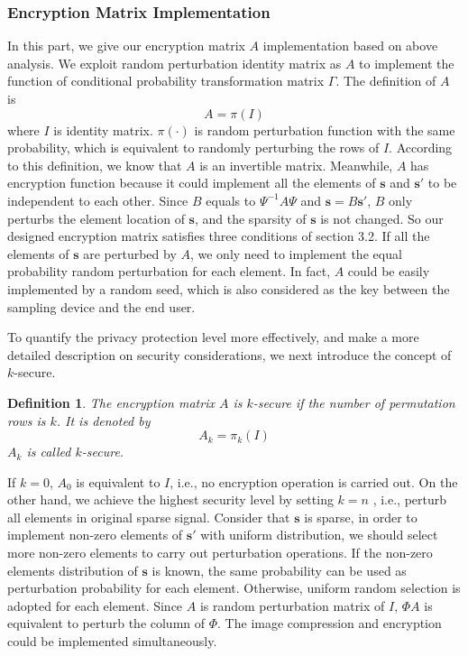 \documentclass[conference]{IEEEtran}
\newtheorem{definition}{Definition}
\begin{document}
\subsubsection{ Encryption Matrix Implementation}
In this part, we give our encryption matrix $A$ implementation based on above analysis.
We exploit random perturbation  identity matrix as $A$ to implement the function of conditional probability transformation matrix $\Gamma$. The definition of $A$ is
\begin{equation}\label{e_def_A}
    A=\pi(I)
\end{equation}
where $I$ is identity matrix. $\pi(\cdot)$ is random perturbation function with the same probability, which is equivalent to randomly perturbing the rows of $I$. According to this definition, we know that $A$ is an invertible matrix. Meanwhile, $A$ has encryption function because it could implement  all the elements of $\mathbf{s}$ and $\mathbf{s}'$  to be independent to each other. Since $B$ equals to $\Psi^{-1}A\Psi$ and $\mathbf{s}=B\mathbf{s}'$, $B$ only perturbs the element location of $\mathbf{s}$, and the sparsity of $\mathbf{s}$ is not changed. So our designed encryption matrix satisfies three conditions of section 3.2.
If all the elements of $\mathbf{s}$ are perturbed by $A$, we only need to implement the equal probability random perturbation for each element. In fact, $A$ could be easily implemented by a random seed, which is also considered as the key between the sampling device and the end user.

To quantify the privacy protection level more effectively, and make a more detailed description on security considerations,  we  next introduce the concept of $k$-secure.
\begin{definition}
The encryption matrix $A$ is $k$-secure if the number of permutation rows is $k$. It is denoted by
\begin{equation}\label{e_sd}
    A_k=\pi_k(I)
\end{equation}
$A_k$ is called $k$-secure.
\end{definition}

If $k=0$, $A_0$ is equivalent to $I$, i.e., no encryption operation is carried out. On the other hand, we achieve the highest security level by setting $k=n$ , i.e., perturb all elements in original sparse signal. Consider that $\mathbf{s}$ is sparse, in order to implement non-zero elements of $\mathbf{s}'$ with uniform distribution, we should select more non-zero elements to carry out perturbation operations. If the non-zero elements distribution of $\mathbf{s}$ is known, the same probability can be used as perturbation probability for each element. Otherwise, uniform random selection is adopted for each element. 
Since $A$ is random perturbation matrix of $I$, $\Phi A$ is equivalent to perturb the column of $\Phi$. The image compression and encryption could be implemented simultaneously. 
\end{document}
